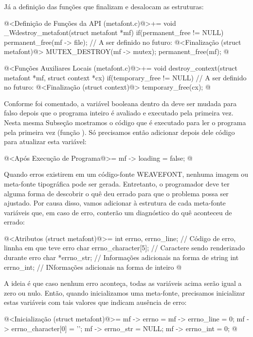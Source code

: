 Já a definição das funções que finalizam e desalocam as estruturas:

\iniciocodigo
@<Definição de Funções da API (metafont.c)@>+=
void _Wdestroy_metafont(struct metafont *mf){
  if(permanent_free != NULL){
    permanent_free(mf -> file);
    // A ser definido no futuro:
    @<Finalização (struct metafont)@>
    MUTEX_DESTROY(mf -> mutex);
    permanent_free(mf);
  }
}
@
\fimcodigo

\iniciocodigo
@<Funções Auxiliares Locais (metafont.c)@>+=
void destroy_context(struct metafont *mf, struct context *cx){
  if(temporary_free != NULL){
    // A ser definido no futuro:
    @<Finalização (struct context)@>
    temporary_free(cx);
  }
}
@
\fimcodigo

Conforme foi comentado, a variável booleana 
dentro da  deve ser mudada para falso
depois que o programa inteiro é avaliado e executado pela primeira
vez. Nesta mesma Subseção mostramos o código que é executado para ler
o programa pela primeira vez (função ). Só
precisamos então adicionar depois dele código para atualizar esta
variável:

\iniciocodigo
@<Após Execução de Programa@>=
mf -> loading = false;
@
\fimcodigo


Quando erros existirem em um código-fonte WEAVEFONT, nenhuma imagem ou
meta-fonte tipográfica pode ser gerada. Entretanto, o programador deve
ter alguma forma de descobrir o quê deu errado para que o problema
possa ser ajustado. Por causa disso, vamos adicionar à estrutura de
cada meta-fonte variáveis que, em caso de erro, conterão um
diagnóstico do quê aconteceu de errado:

\iniciocodigo
@<Atributos (struct metafont)@>=
  int errno, errno_line; // Código de erro, linnha em que teve erro
  char errno_character[5]; // Caractere sendo renderizado durante erro
  char *errno_str; // Informações adicionais na forma de string
  int errno_int; // INformações adicionais na forma de inteiro
@
\fimcodigo

A ideia é que caso nenhum erro aconteça, todas as variáveis acima
serão igual a zero ou nulo. Então, quando inicializamos uma
meta-fonte, precisamos inicializar estas variáveis com tais valores
que indicam ausência de erro:

\iniciocodigo
@<Inicialização (struct metafont)@>=
mf -> errno = mf -> errno_line = 0;
mf -> errno_character[0] = '\0';
mf -> errno_str = NULL;
mf -> errno_int = 0;
@
\fimcodigo

